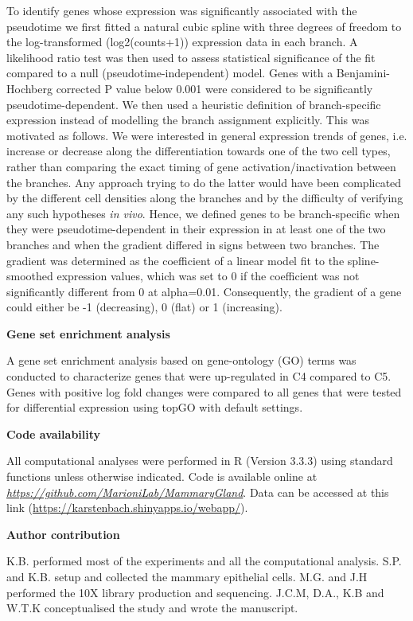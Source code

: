 \documentclass[titlepage, 12pt, oneside]{amsart}
\begin{document}
To identify genes whose expression was significantly associated with the pseudotime we first fitted a natural cubic spline with three degrees of freedom to the log-transformed (log2(counts+1)) expression data in each branch.
A likelihood ratio test was then used to assess statistical significance of the fit compared to a null (pseudotime-independent) model.
Genes with a Benjamini-Hochberg corrected P value below 0.001 were considered to be significantly pseudotime-dependent.
We then used a heuristic definition of branch-specific expression instead of modelling the branch assignment explicitly.
This was motivated as follows. We were interested in general expression trends of genes, i.e. increase or decrease along the differentiation towards one of the two cell types, rather than comparing the exact timing of gene activation/inactivation between the branches.
Any approach trying to do the latter would have been complicated by the different cell densities along the branches and by the difficulty of verifying any such hypotheses \textit{in vivo}.
Hence, we defined genes to be branch-specific when they were pseudotime-dependent in their expression in at least one of the two branches and when the gradient differed in signs between two branches.
The gradient was determined as the coefficient of a linear model fit to the spline-smoothed expression values, which was set to 0 if the coefficient was not significantly different from 0 at alpha=0.01.
Consequently, the gradient of a gene could either be -1 (decreasing), 0 (flat) or 1 (increasing).

\textbf{Gene set enrichment analysis}

A gene set enrichment analysis based on gene-ontology (GO) terms was conducted to characterize genes that were up-regulated in C4 compared to C5.
Genes with positive log fold changes were compared to all genes that were tested for differential expression using topGO with default settings\autocite{Alexa2016}.

\textbf{Code availability}

All computational analyses were performed in R (Version 3.3.3) using standard functions unless otherwise indicated.
Code is available online at \href{https://github.com/MarioniLab/MammaryGland}{\textit{https://github.com/MarioniLab/MammaryGland}}.
Data can be accessed at this link (\url{https://karstenbach.shinyapps.io/webapp/}).

\textbf{Author contribution}

K.B. performed most of the experiments and all the computational analysis.
S.P. and K.B. setup and collected the mammary epithelial cells.
M.G. and J.H performed the 10X library production and sequencing.
J.C.M, D.A., K.B and W.T.K conceptualised the study and wrote the manuscript.
\end{document}
